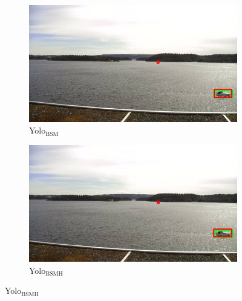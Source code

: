 \begin{figure}[h!]
\begin{subfigure}{.5\textwidth}
  \centering
  \includegraphics[width=0.9\linewidth]{results/case_buildings/yolo23/samemistake/yolo2/selected_08_07_frame11155.jpg}
  \caption{Yolo$_{\text{BSM}}$}
\end{subfigure}%
\begin{subfigure}{.5\textwidth}
  \centering
  \includegraphics[width=.9\linewidth]{results/case_buildings/yolo23/samemistake/yolo3/selected_08_07_frame11155.jpg}
  \caption{Yolo$_{\text{BSMH}}$}
\end{subfigure}


\end{figure}
